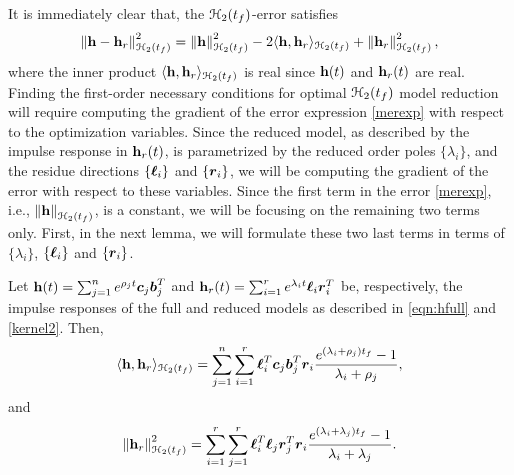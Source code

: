 \documentclass[twocolumn]{autart}
\begin{document}
It is immediately clear that, the $\EuScript{H}_2(t_f)$-error satisfies 
\begin{equation}\label{merexp}
\begin{aligned}
{
\left\lVert\mathbf{h}-\mathbf{h}_r\right\rVert_{\EuScript{H}_2({t_f})}^2=\left\lVert\mathbf{h}\right\rVert_{\EuScript{H}_2({t_f})}^2-2 \langle\mathbf{h}, \mathbf{h}_r\rangle_{\EuScript{H}_2({t_f})}+\left\lVert\mathbf{h}_r\right\rVert_{\EuScript{H}_2({t_f})}^2,
}
\end{aligned}
\end{equation}
where the inner product  $\langle\mathbf{h}, \mathbf{h}_r\rangle_{\EuScript{H}_2({t_f})}$ is real since $\mathbf{h}(t)$ and $\mathbf{h}_r(t)$ are real. Finding the first-order necessary conditions for optimal ${\EuScript{H}_2({t_f})}$ model reduction will require computing the gradient of the error expression \eqref{merexp} with respect to the optimization variables. 
Since the reduced model, as described by  the impulse response in $\mathbf{h}_r(t)$, is parametrized by the 
reduced order poles $\{\lambda_i\}$, and the residue directions $\{\boldsymbol{\ell}_i\}$ and $\{\boldsymbol{r}_i\}$, we will be computing the gradient of the error with respect to these variables. Since the first term in the error \eqref{merexp}, i.e., $\left\lVert\mathbf{h}\right\rVert_{\EuScript{H}_2({t_f})}$, is a constant, we will be focusing on the remaining two terms only. First, in the next lemma, we will formulate these two last terms in terms of $\{\lambda_i\}$, 
$\{\boldsymbol{\ell}_i\}$ and $\{\boldsymbol{r}_i\}$.
\begin{Lemma}\label{minnerexp}

Let  $\mathbf{h} (t)= \sum_{j=1}^n e^{\rho_jt} \boldsymbol{c}_j \boldsymbol{b}_j^T $ and $\mathbf{h}_r(t) = \sum_{i=1}^r e^{\lambda_it}\boldsymbol{\ell}_i  \boldsymbol{r}_i^T $ be, respectively, the impulse responses of the full and reduced models  as described in \eqref{eqn:hfull} and \eqref{kernel2}.
Then,
\begin{align} \label{eqn:hhr}
\langle\mathbf{h}, \mathbf{h}_r\rangle_{\EuScript{H}_2({t_f})}=\sum_{j=1}^n\sum_{i=1}^r\boldsymbol{\ell}_{i}^T\boldsymbol{c}_j\boldsymbol{b}_j^T\boldsymbol{r}_{i}\dfrac{e^{(\lambda_i+\rho_j){t_f}}-1}{\lambda_i+\rho_j},
\end{align}
and
\begin{align} \label{eqn:hrhr}
\left\lVert\mathbf{h}_r\right\rVert_{\EuScript{H}_2({t_f})}^2= \sum_{i=1}^r\sum_{j=1}^r\boldsymbol{\ell}_{i}^T\boldsymbol{\ell}_{j}\boldsymbol{r}_{j}^T\boldsymbol{r}_{i}\dfrac{e^{(\lambda_i+\lambda_j){t_f}}-1}{\lambda_i+\lambda_j}.
\end{align}
\end{Lemma}
\end{document}
